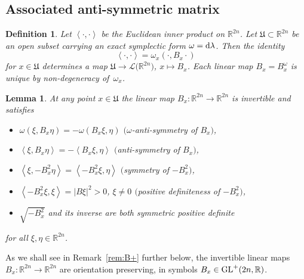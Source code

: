 \documentclass[pdftex]{sigma}
\numberwithin{equation}{section}
\newtheorem{Lemma}[Theorem]{Lemma}
\newtheorem{Definition}[Theorem]{Definition}
\newcommand{\R}{{\mathbb{R}}}
\newcommand{\Ll}{{\mathcal{L}}} %
\newcommand{\GL}{{\rm GL}}
\newcommand{\INNER}[2]{\left\langle #1, #2\right\rangle}
\def\abs#1{\mathopen|#1\mathclose|}
\newcommand{\1}{{{\mathchoice {\rm 1\mskip-4mu l} {\rm 1\mskip-4mu l}
{\rm 1\mskip-4.5mu l} {\rm 1\mskip-5mu l}}}}
\begin{document}
\subsection{Associated anti-symmetric matrix}

\begin{Definition}
Let $\INNER{\cdot}{\cdot}$ be the Euclidean inner product on $\R^{2n}$.
Let $\mathfrak{U}\subset\R^{2n}$ be an open subset carrying an exact symplectic
form $\omega={\rm d}\lambda$. Then the identity
\begin{equation}\label{eq:B}
 \INNER{\cdot}{\cdot}
 =\omega_x(\cdot,B_x\cdot)
\end{equation}
for $x\in \mathfrak{U}$ determines a map $\mathfrak{U}\to\Ll\bigl(\R^{2n}\bigr)$, $x\mapsto B_x$. Each
linear map $B_x=B_x^\omega$ is unique by non-degeneracy of~$\omega_x$.
\end{Definition}

\begin{Lemma}\label{le:hghjghj8656h}
At any point $x\in \mathfrak{U}$ the linear map
$B_x\colon\R^{2n}\to\R^{2n}$ is invertible and satisfies
\begin{itemize}\itemsep=0ex
\item[$(i)$]
 $\omega(\xi,B_x\eta)=-\omega(B_x\xi,\eta)$
$(\omega$-anti-symmetry of $B_x)$,
\item[$(ii)$]
 $\INNER{\xi}{B_x\eta}=-\INNER{B_x\xi}{\eta}$
 $($anti-symmetry of $B_x)$,
\item[$(iii)$]
 $\INNER{\xi}{-B_x^2\eta}=\INNER{-B_x^2\xi}{\eta}$
 $($symmetry of $-B_x^2)$,
\item[$(iv)$]
 $\INNER{-B_x^2\xi}{\xi}=\abs{B\xi}^2>0$, $\xi\not= 0$
 $($positive definiteness of $-B_x^2)$,
\item[$(v)$]
 $\sqrt{-B_x^2}$ and its inverse are both symmetric positive
 definite
\end{itemize}
for all $\xi,\eta\in\R^{2n}$.
\end{Lemma}

As we shall see in Remark~\ref{rem:B+} further below,
the invertible linear maps $B_x\colon\R^{2n}\to\R^{2n}$ are
orientation preserving, in symbols $B_x\in\GL^+(2n,\R)$.
\end{document}
